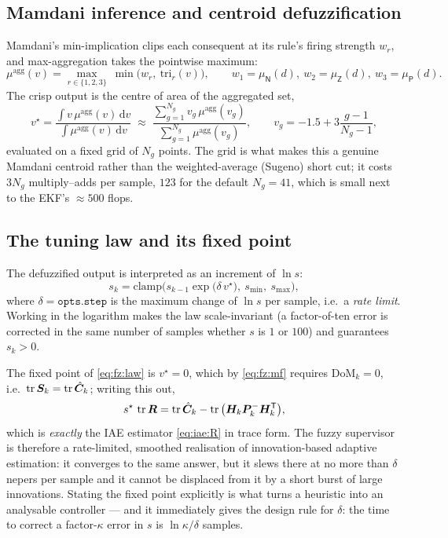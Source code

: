 \subsection{Mamdani inference and centroid defuzzification}
Mamdani's min-implication clips each consequent at its rule's firing strength
$w_r$, and max-aggregation takes the pointwise maximum:
\begin{equation}
\mu^{\text{agg}}(v) = \max_{r\in\{1,2,3\}}\ \min\!\big(w_r,\ \mathrm{tri}_r(v)\big),
\qquad w_1=\mu_{\mathsf N}(d),\ w_2=\mu_{\mathsf Z}(d),\ w_3=\mu_{\mathsf P}(d).
\label{eq:fz:agg}
\end{equation}
The crisp output is the centre of area of the aggregated set,
\begin{equation}
v^\star = \frac{\int v\,\mu^{\text{agg}}(v)\,\mathrm{d}v}{\int \mu^{\text{agg}}(v)\,\mathrm{d}v}
\;\approx\; \frac{\sum_{g=1}^{N_g} v_g\,\mu^{\text{agg}}(v_g)}{\sum_{g=1}^{N_g}\mu^{\text{agg}}(v_g)},
\qquad v_g = -1.5 + 3\frac{g-1}{N_g-1},
\label{eq:fz:centroid}
\end{equation}
evaluated on a fixed grid of $N_g$ points.  The grid is what makes this a genuine Mamdani centroid
rather than the weighted-average (Sugeno) short cut; it costs $3N_g$ multiply--adds per sample,
$123$ for the default $N_g=41$, which is small next to the EKF's $\approx500$ flops.

\subsection{The tuning law and its fixed point}
The defuzzified output is interpreted as an increment of $\ln s$:
\begin{equation}
s_k = \mathrm{clamp}\Big(s_{k-1}\exp\big(\delta\, v^\star\big),\ s_{\min},\ s_{\max}\Big),
\label{eq:fz:law}
\end{equation}
where $\delta = \texttt{opts.step}$ is the maximum change of $\ln s$ per sample, i.e.\ a
\emph{rate limit}.  Working in the logarithm makes the law scale-invariant (a factor-of-ten error is
corrected in the same number of samples whether $s$ is $1$ or $100$) and guarantees $s_k>0$.

The fixed point of \eqref{eq:fz:law} is $v^\star=0$, which by \eqref{eq:fz:mf} requires
$\mathrm{DoM}_k=0$, i.e.\ $\operatorname{tr}\bm{S}_k=\operatorname{tr}\hat{\bm{C}}_k$; writing this out,
\begin{equation}
s^\star\,\operatorname{tr}\bm{R} = \operatorname{tr}\hat{\bm{C}}_k - \operatorname{tr}\big(\bm{H}_k\bm{P}^{-}_k\bm{H}_k^{\mathsf{T}}\big),
\label{eq:fz:fp}
\end{equation}
which is \emph{exactly} the IAE estimator \eqref{eq:iae:R} in trace form.  The fuzzy supervisor is
therefore a rate-limited, smoothed realisation of innovation-based adaptive estimation: it converges
to the same answer, but it slews there at no more than $\delta$ nepers per sample and it cannot be
displaced from it by a short burst of large innovations.  Stating the fixed point explicitly is what
turns a heuristic into an analysable controller --- and it immediately gives the design rule for
$\delta$: the time to correct a factor-$\kappa$ error in $s$ is $\ln\kappa/\delta$ samples.

